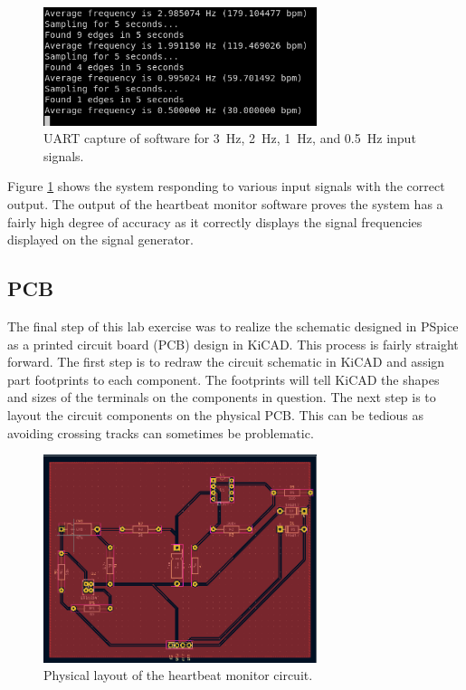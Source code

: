 \documentclass[CMPE]{../KGCOEReport}
\begin{document}
	\begin{figure}[h!]
        \centering
        \includegraphics[width=8cm]{output}
        \caption{UART capture of software for \SI{3}{\hertz}, \SI{2}{\hertz},
	\SI{1}{\hertz}, and \SI{0.5}{\hertz} input signals.}
        \label{fig:output}
	\end{figure}

	Figure \ref{fig:output} shows the system responding to various input signals
	with the correct output. The output of the heartbeat monitor software proves
	the system has a fairly high degree of accuracy as it correctly displays the
	signal frequencies displayed on the signal generator.

	\subsection*{PCB}

	The final step of this lab exercise was to realize the schematic designed in
	PSpice as a printed circuit board (PCB) design in KiCAD. This process is fairly
	straight forward. The first step is to redraw the circuit schematic in KiCAD
	and assign part footprints to each component. The footprints will tell KiCAD the
	shapes and sizes of the terminals on the components in question. The next step
	is to layout the circuit components on the physical PCB. This can be tedious
	as avoiding crossing tracks can sometimes be problematic.

	\begin{figure}[h!]
        \centering
        \includegraphics[width=8cm]{pcb}
        \caption{Physical layout of the heartbeat monitor circuit.}
        \label{fig:pcb}
	\end{figure}
\end{document}
